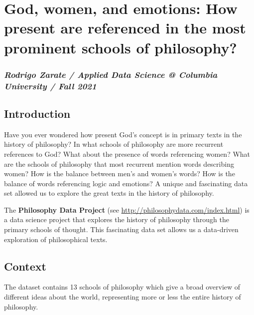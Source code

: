 \documentclass[
]{article}
\author{}
\date{\vspace{-2.5em}}
\begin{document}
\hypertarget{god-women-and-emotions-how-present-are-referenced-in-the-most-prominent-schools-of-philosophy}{%
\section{God, women, and emotions: How present are referenced in the
most prominent schools of
philosophy?}\label{god-women-and-emotions-how-present-are-referenced-in-the-most-prominent-schools-of-philosophy}}

\hypertarget{rodrigo-zarate-applied-data-science-columbia-university-fall-2021}{%
\subsubsection{\texorpdfstring{\emph{Rodrigo Zarate / Applied Data
Science @ Columbia University / Fall
2021}}{Rodrigo Zarate / Applied Data Science @ Columbia University / Fall 2021}}\label{rodrigo-zarate-applied-data-science-columbia-university-fall-2021}}

\hypertarget{introduction}{%
\subsection{Introduction}\label{introduction}}

Have you ever wondered how present God's concept is in primary texts in
the history of philosophy? In what schools of philosophy are more
recurrent references to God? What about the presence of words
referencing women? What are the schools of philosophy that most
recurrent mention words describing women? How is the balance between
men's and women's words? How is the balance of words referencing logic
and emotions? A unique and fascinating data set allowed us to explore
the great texts in the history of philosophy.

The \textbf{Philosophy Data Project} (see
\url{http://philosophydata.com/index.html}) is a data science project
that explores the history of philosophy through the primary schools of
thought. This fascinating data set allows us a data-driven exploration
of philosophical texts.

\hypertarget{context}{%
\subsection{Context}\label{context}}

The dataset contains 13 schools of philosophy which give a broad
overview of different ideas about the world, representing more or less
the entire history of philosophy.
\end{document}
